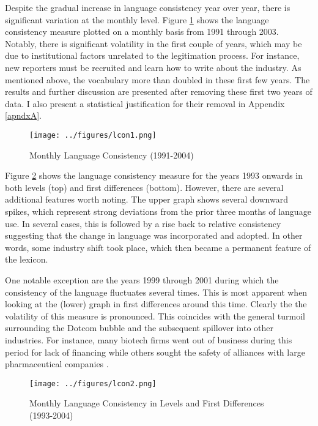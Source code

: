 Despite the gradual increase in language consistency year over year, there is significant variation at the monthly level. Figure \ref{lcon1} shows the language consistency measure plotted on a monthly basis from 1991 through 2003. Notably, there is significant volatility in the first couple of years, which may be due to institutional factors unrelated to the legitimation process. For instance, new reporters must be recruited and learn how to write about the industry. As mentioned above, the vocabulary more than doubled in these first few years. The results and further discussion are presented after removing these first two years of data. I also present a statistical justification for their removal in Appendix \ref{apndxA}.

\begin{figure}
\begin{center}
\texttt{[image: ../figures/lcon1.png]}
\caption[Monthly Language Consistency (1991-2004)]{Monthly Language Consistency (1991-2004)\label{lcon1}}
\end{center}
\end{figure}

Figure \ref{lcon2} shows the language consistency measure for the years 1993 onwards in both levels (top) and first differences (bottom). However, there are several additional features worth noting. The upper graph shows several downward spikes, which represent strong deviations from the prior three months of language use. In several cases, this is followed by a rise back to relative consistency suggesting that the change in language was incorporated and adopted. In other words, some industry shift took place, which then became a permanent feature of the lexicon.

One notable exception are the years 1999 through 2001 during which the consistency of the language fluctuates several times. This is most apparent when looking at the (lower) graph in first differences around this time. Clearly the the volatility of this measure is pronounced. This coincides with the general turmoil surrounding the Dotcom bubble and the subsequent spillover into other industries. For instance, many biotech firms went out of business during this period for lack of financing while others sought the safety of alliances with large pharmaceutical companies \citep{wolff2001}.

\begin{figure}
\begin{center}
\texttt{[image: ../figures/lcon2.png]}
\caption[Monthly Language Consistency, Levels and Differences (1993-2004)]{Monthly Language Consistency in Levels and First Differences (1993-2004)\label{lcon2}}
\end{center}
\end{figure}

